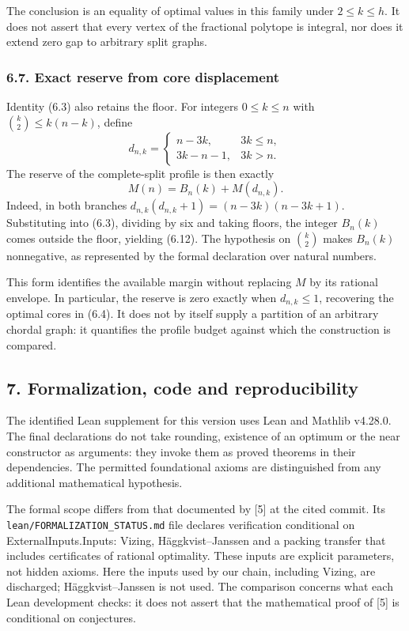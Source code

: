 \documentclass[english,11pt,a4paper]{article}
\begin{document}
The conclusion is an equality of optimal values in this family under \(2\le k\le h\). It does not assert that every vertex of the fractional polytope is integral, nor does it extend zero gap to arbitrary split graphs.

\subsubsection{6.7. Exact reserve from core displacement}\label{exact-reserve-from-core-displacement}

Identity (6.3) also retains the floor. For integers \(0\le k\le n\) with \(\binom k2\le k(n-k)\), define \[
d_{n,k}=\begin{cases}n-3k,&3k\le n,\\3k-n-1,&3k>n.\end{cases}
\] The reserve of the complete-split profile is then exactly \[
M(n)=B_n(k)+M(d_{n,k}).
\tag{6.12}
\] Indeed, in both branches \(d_{n,k}(d_{n,k}+1)=(n-3k)(n-3k+1)\). Substituting into (6.3), dividing by six and taking floors, the integer \(B_n(k)\) comes outside the floor, yielding (6.12). The hypothesis on \(\binom k2\) makes \(B_n(k)\) nonnegative, as represented by the formal declaration over natural numbers.

This form identifies the available margin without replacing \(M\) by its rational envelope. In particular, the reserve is zero exactly when \(d_{n,k}\le1\), recovering the optimal cores in (6.4). It does not by itself supply a partition of an arbitrary chordal graph: it quantifies the profile budget against which the construction is compared.

\subsection{7. Formalization, code and reproducibility}\label{formalization-code-and-reproducibility}

The identified Lean supplement for this version uses Lean and Mathlib v4.28.0. The final declarations do not take rounding, existence of an optimum or the near constructor as arguments: they invoke them as proved theorems in their dependencies. The permitted foundational axioms are distinguished from any additional mathematical hypothesis.

The formal scope differs from that documented by {[}5{]} at the cited commit. Its \nolinkurl{lean/FORMALIZATION_STATUS.md} file declares verification conditional on {\ttfamily\small ExternalInpu\discretionary{\hbox{\ensuremath{\hookrightarrow}}}{}{}ts.\discretionary{\hbox{\ensuremath{\hookrightarrow}}}{}{}Inputs}: Vizing, Häggkvist--Janssen and a packing transfer that includes certificates of rational optimality. These inputs are explicit parameters, not hidden axioms. Here the inputs used by our chain, including Vizing, are discharged; Häggkvist--Janssen is not used. The comparison concerns what each Lean development checks: it does not assert that the mathematical proof of {[}5{]} is conditional on conjectures.
\end{document}
